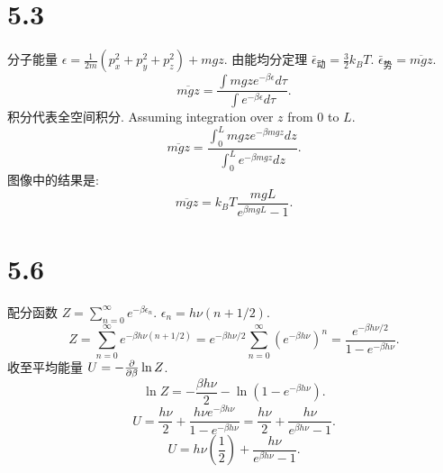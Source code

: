 \documentclass{article}
\begin{document}
\section*{5.3}
分子能量 $\epsilon = \frac{1}{2m}(p_x^2 + p_y^2 + p_z^2) + mgz$.
由能均分定理 $\bar{\epsilon}_{动} = \frac{3}{2} k_B T$.
$\bar{\epsilon}_{势} = \overline{mgz}$.
\[ \overline{mgz} = \frac{\int mgz e^{-\beta \epsilon} d\tau}{\int e^{-\beta \epsilon} d\tau}. \]
积分代表全空间积分. Assuming integration over $z$ from 0 to $L$.
\[ \overline{mgz} = \frac{\int_0^L mgz e^{-\beta mgz} dz}{\int_0^L e^{-\beta mgz} dz}. \]
图像中的结果是:
\[ \overline{mgz} = k_B T \frac{mgL}{e^{\beta mgL}-1}. \]

\section*{5.6}
配分函数 $Z = \sum_{n=0}^\infty e^{-\beta \epsilon_n}$.
$\epsilon_n = h\nu (n + 1/2)$.
\[ Z = \sum_{n=0}^\infty e^{-\beta h\nu (n+1/2)} = e^{-\beta h\nu/2} \sum_{n=0}^\infty (e^{-\beta h\nu})^n = \frac{e^{-\beta h\nu/2}}{1 - e^{-\beta h\nu}}. \]
收至平均能量 $U = -\pdv{}{\beta} \ln Z$.
\[ \ln Z = -\frac{\beta h\nu}{2} - \ln(1 - e^{-\beta h\nu}). \]
\[ U = \frac{h\nu}{2} + \frac{h\nu e^{-\beta h\nu}}{1 - e^{-\beta h\nu}} = \frac{h\nu}{2} + \frac{h\nu}{e^{\beta h\nu} - 1}. \]
\[ U = h\nu\left(\frac{1}{2}\right) + \frac{h\nu}{e^{\beta h\nu}-1}. \]
\end{document}
